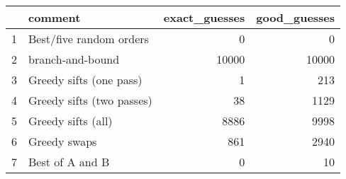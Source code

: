 \begin{table}[ht]
\centering
\begin{tabular}{rlrr}
  \hline
 & comment & exact\_guesses & good\_guesses \\ 
  \hline
1 & Best/five random orders &   0 &   0 \\ 
  2 & branch-and-bound & 10000 & 10000 \\ 
  3 & Greedy sifts (one pass) &   1 & 213 \\ 
  4 & Greedy sifts (two passes) &  38 & 1129 \\ 
  5 & Greedy sifts (all) & 8886 & 9998 \\ 
  6 & Greedy swaps & 861 & 2940 \\ 
  7 & Best of A and B &   0 &  10 \\ 
   \hline
\end{tabular}
\end{table}
